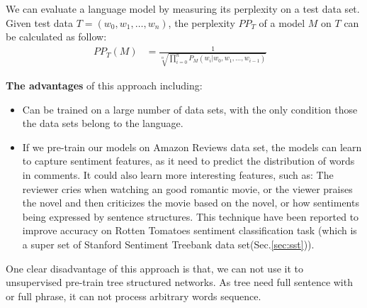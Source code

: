 We can evaluate a language model by measuring its perplexity on a test data set. Given test data \(T = (w_0, w_1,\ldots,w_n)\), the perplexity \(PP_T\) of a model \(M\) on \(T\) can be calculated as follow\cite{perplexity}:
\begin{align}
	PP_T(M) &= \frac{1}{\sqrt[n]{\prod_{i=0}^{n} P_M(w_{i}|w_0, w_1,\ldots,w_{i-1})}}&
\end{align}

\textbf{The advantages} of this approach including:
\begin{itemize}
\item Can be trained on a large number of data sets, with the only condition those the data sets belong to the language.
\item If we pre-train our models on Amazon Reviews data set, the models can learn to capture sentiment features, as it need to predict the distribution of words in comments.
It could also learn more interesting features, such as: 
The reviewer cries when watching an good romantic movie, or the viewer praises the novel and then criticizes the movie based on the novel, or how sentiments being expressed by sentence structures. 
This technique have been reported to improve accuracy on Rotten Tomatoes sentiment classification task\cite{Rotten-Tomato} (which is a super set of Stanford Sentiment Treebank data set(Sec.\ref{sec:sst})).
\end{itemize}

One clear disadvantage of this approach is that, we can not use it to unsupervised pre-train tree structured networks. 
As tree need full sentence with or full phrase, it can not process arbitrary words sequence. 

